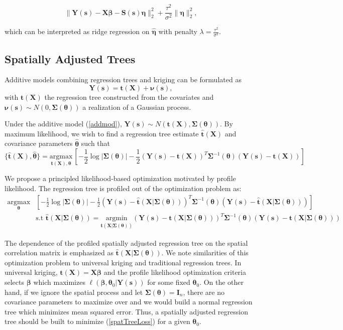 \documentclass[12pt]{article}
\newcommand{\proc}{\mathbf{Y}(\mathbf{s})}
\newcommand{\covs}{\mathbf{X}}
\newcommand{\eye}{\mathbf{I} }
\newcommand{\tree} { \mathbf{t} (\covs) }
\newcommand{\treehat} { \mathbf{ \hat t} (\covs) }
\newcommand{\spproc}{\boldsymbol{\nu}(\mathbf{s})}
\newcommand{\pars}{\boldsymbol{\theta}}
\newcommand{\estpars}{\boldsymbol{\hat \theta}}
\newcommand{\Sig}{\boldsymbol{\Sigma}}
\newcommand{\estre}{\boldsymbol{\hat \eta}}
\newcommand{\spatbas}{\mathbf{S}(\mathbf{s})}
\newcommand{\proftree}{\mathbf{\hat t}(\covs | \Sig (\pars))}
\newcommand{\bbeta}{\boldsymbol{\beta}}
\begin{document}
$$ \|\proc- \covs \boldsymbol{ \beta} - \spatbas \boldsymbol{ \eta}\|_2^2 + \frac{\tau^2}{\sigma^2} \| \boldsymbol{\eta} \|_2^2,$$ 


which can be interpreted as ridge regression on $\estre$ with penalty $\lambda = \frac{\tau^2}{\sigma^2}$. 

\subsection{Spatially Adjusted Trees}

Additive models combining regression trees and kriging can be formulated as
\begin{equation}
\label{addmod}
\proc = \tree+ \spproc ,
\end{equation}
with $\tree$ the regression tree constructed from the covariates and $\spproc \sim N(0,\Sig (\pars))$ a realization of a Gaussian process. 

Under the additive model (\ref{addmod}), $\proc \sim N(\tree,\Sig(\pars))$. By maximum likelihood, we wish to find a regression tree estimate $\treehat$ and covariance parameters $ \estpars $ such that 
\begin{equation}
\label{pseudologlik}
\{ \treehat, \estpars \} = \underset{ \tree,\pars }{\text{argmax} }\, \left[ -\frac{1}{2} \log | \Sig(\pars) | - \frac{1}{2} (\proc - \tree)^T \Sig^{-1}(\pars) (\proc- \tree) \right]
\end{equation}

We propose a principled likelihood-based optimization motivated by profile likelihood. The regression tree is profiled out of the optimization problem as:
\begin{align}
\underset{\pars}{\text{argmax} } & \left[ -\frac{1}{2} \log | \Sig(\pars) | - \frac{1}{2} (\proc - \proftree)^T \Sig^{-1} (\pars) (\proc- \proftree) \right] \nonumber \\
& \text{s.t} \,\, \proftree = \underset{\mathbf{t} (\covs|\Sig(\pars)) }{\text{argmin} } \left(\proc- \mathbf{t} \left(\covs|\Sig(\pars) \right) \right)^T \Sig^{-1}(\pars) \left(\proc- \mathbf{t} \left(\covs|\Sig(\pars) \right) \right) \label{spatTreeLoss}
\end{align}

The dependence of the profiled spatially adjusted regression tree on the spatial correlation matrix is emphasized as $\proftree$. We note similarities of this optimization problem to universal kriging and traditional regression trees. In universal kriging, $\tree = \covs \bbeta$ and the profile likelihood optimization criteria selects $\bbeta$ which maximizes $\ell (\bbeta, \pars_0 |\proc)$ for some fixed $\pars_0$. On the other hand, if we ignore the spatial process and let $\Sig(\pars) = \eye_n$, there are no covariance parameters to maximize over and we would build a normal regression tree which minimizes mean squared error. Thus, a spatially adjusted regression tree should be built to minimize (\ref{spatTreeLoss}) for a given $\pars_0$. 
\end{document}
